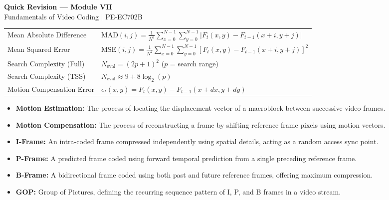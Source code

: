 \documentclass[12pt,a4paper]{article}
\renewcommand{\arraystretch}{1.45}
\begin{document}
\newpage

\begin{center}
  {\large\bfseries\color{myred} Quick Revision --- Module VII}\\[3pt]
  {\small\color{mydark} Fundamentals of Video Coding $|$ PE-EC702B}
\end{center}
\noindent{\color{myred}\rule{\linewidth}{1.2pt}}
\vspace{4pt}

\begin{tcolorbox}[formulabox, title={\textbf{Key Formulas at a Glance}}]
\renewcommand{\arraystretch}{1.3}
\begin{tabularx}{\linewidth}{B{5.0cm} X}Mean Absolute Difference & $\text{MAD}(i,j) = \frac{1}{N^2} \sum_{x=0}^{N-1} \sum_{y=0}^{N-1} \left| F_t(x,y) - F_{t-1}(x+i, y+j) \right|$ \\
Mean Squared Error & $\text{MSE}(i,j) = \frac{1}{N^2} \sum_{x=0}^{N-1} \sum_{y=0}^{N-1} \left[ F_t(x,y) - F_{t-1}(x+i, y+j) \right]^2$ \\
Search Complexity (Full) & $N_{\text{eval}} = (2p + 1)^2$ \quad ($p$ = search range) \\
Search Complexity (TSS) & $N_{\text{eval}} \approx 9 + 8 \log_2(p)$ \\
Motion Compensation Error & $e_t(x,y) = F_t(x,y) - F_{t-1}(x + dx, y + dy)$
\end{tabularx}
\end{tcolorbox}

\begin{tcolorbox}[defbox, title={\textbf{One-Line Definitions}}]
\begin{itemize}[leftmargin=*, itemsep=2.5pt, topsep=0pt]
  \item \textbf{Motion Estimation:} The process of locating the displacement vector of a macroblock between successive video frames.
  \item \textbf{Motion Compensation:} The process of reconstructing a frame by shifting reference frame pixels using motion vectors.
  \item \textbf{I-Frame:} An intra-coded frame compressed independently using spatial details, acting as a random access sync point.
  \item \textbf{P-Frame:} A predicted frame coded using forward temporal prediction from a single preceding reference frame.
  \item \textbf{B-Frame:} A bidirectional frame coded using both past and future reference frames, offering maximum compression.
  \item \textbf{GOP:} Group of Pictures, defining the recurring sequence pattern of I, P, and B frames in a video stream.
\end{itemize}
\end{tcolorbox}
\end{document}
